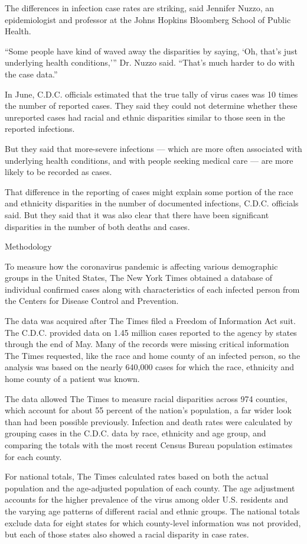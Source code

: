 The differences in infection case rates are striking, said Jennifer
Nuzzo, an epidemiologist and professor at the Johns Hopkins Bloomberg
School of Public Health.

``Some people have kind of waved away the disparities by saying, `Oh,
that's just underlying health conditions,''' Dr. Nuzzo said. ``That's
much harder to do with the case data.''

In June, C.D.C. officials estimated that the true tally of virus cases
was 10 times the number of reported cases. They said they could not
determine whether these unreported cases had racial and ethnic
disparities similar to those seen in the reported infections.

But they said that more-severe infections --- which are more often
associated with underlying health conditions, and with people seeking
medical care --- are more likely to be recorded as cases.

That difference in the reporting of cases might explain some portion of
the race and ethnicity disparities in the number of documented
infections, C.D.C. officials said. But they said that it was also clear
that there have been significant disparities in the number of both
deaths and cases.

Methodology

To measure how the coronavirus pandemic is affecting various demographic
groups in the United States, The New York Times obtained a database of
individual confirmed cases along with characteristics of each infected
person from the Centers for Disease Control and Prevention.

The data was acquired after The Times filed a Freedom of Information Act
suit. The C.D.C. provided data on 1.45 million cases reported to the
agency by states through the end of May. Many of the records were
missing critical information The Times requested, like the race and home
county of an infected person, so the analysis was based on the nearly
640,000 cases for which the race, ethnicity and home county of a patient
was known.

The data allowed The Times to measure racial disparities across 974
counties, which account for about 55 percent of the nation's population,
a far wider look than had been possible previously. Infection and death
rates were calculated by grouping cases in the C.D.C. data by race,
ethnicity and age group, and comparing the totals with the most recent
Census Bureau population estimates for each county.

For national totals, The Times calculated rates based on both the actual
population and the age-adjusted population of each county. The age
adjustment accounts for the higher prevalence of the virus among older
U.S. residents and the varying age patterns of different racial and
ethnic groups. The national totals exclude data for eight states for
which county-level information was not provided, but each of those
states also showed a racial disparity in case rates.

